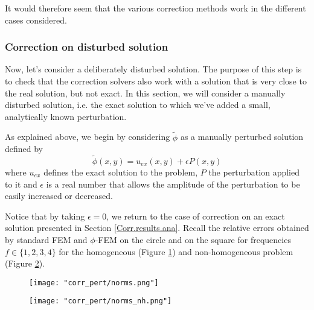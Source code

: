 It would therefore seem that the various correction methods work in the different cases considered.

\subsubsection{Correction on disturbed solution} \label{Corr.results.disturbed}

Now, let's consider a deliberately disturbed solution. The purpose of this step is to check that the correction solvers also work with a solution that is very close to the real solution, but not exact. In this section, we will consider a manually disturbed solution, i.e. the exact solution to which we've added a small, analytically known perturbation.

As explained above, we begin by considering $\tilde{\phi}$ as a manually perturbed solution defined by
\begin{equation*}
	\tilde{\phi}(x,y)=u_{ex}(x,y)+\epsilon P(x,y)
\end{equation*}
where $u_{ex}$ defines the exact solution to the problem, $P$ the perturbation applied to it and $\epsilon$ is a real number that allows the amplitude of the perturbation to be easily increased or decreased. 

\begin{Rem}
	Notice that by taking $\epsilon=0$, we return to the case of correction on an exact solution presented in Section \ref{Corr.results.ana}. Recall the relative errors obtained by standard FEM and $\phi$-FEM on the circle and on the square for frequencies $f\in\{1,2,3,4\}$ for the homogeneous  (Figure \ref{norms}) and non-homogeneous problem  (Figure \ref{norms_nh}).
	
	\begin{minipage}{0.48\linewidth}
		\begin{figure}[H]
			\centering
			\texttt{[image: "corr\_pert/norms.png"]}
			\label{norms}
		\end{figure} 
	\end{minipage}
	\begin{minipage}{0.48\linewidth}
		\begin{figure}[H]
			\centering
			\texttt{[image: "corr\_pert/norms\_nh.png"]}
			\label{norms_nh}
		\end{figure} 
	\end{minipage}
\end{Rem}

